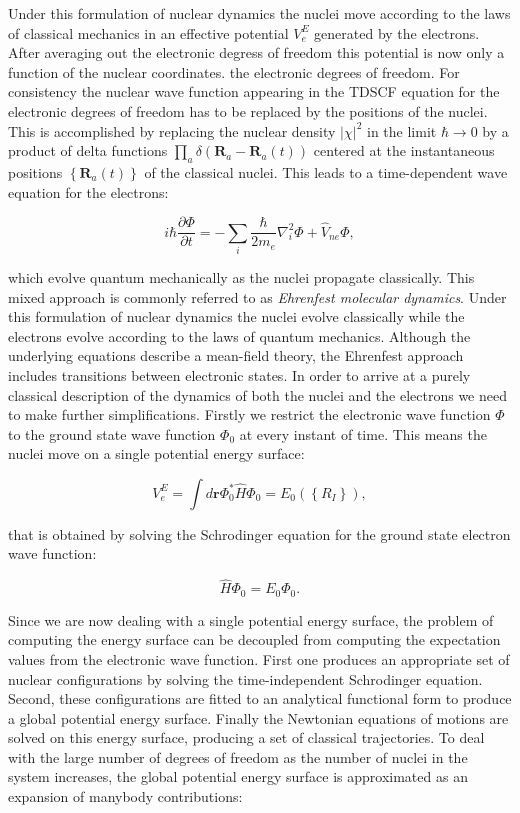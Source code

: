 Under this formulation of nuclear dynamics
the nuclei move according to the laws of classical
mechanics in an effective potential $V_e^E$ generated
by the electrons.
After averaging out the electronic degress of freedom
this potential is now only a function of the nuclear coordinates.
the electronic degrees of freedom.
For consistency the nuclear wave function appearing
in the TDSCF equation for the electronic
degrees of freedom has to be replaced by the positions
of the nuclei.
This is accomplished by replacing the nuclear density 
$\left| \chi \right|^2$ in the limit $\hbar \rightarrow 0$
by a product of delta functions
$ \prod_a \delta (\bm{R}_a - \bm{R}_a(t)) $ centered
at the instantaneous positions $\left\{ \bm{R}_a(t) \right\}$
of the classical nuclei.
This leads to a time-dependent wave equation
for the electrons:

\begin{equation}
 i\hbar\frac{\partial \Phi}{\partial t} =
    -\sum_i \frac{\hbar}{2m_e} \nabla_i^2 \Phi
    + \hat{V}_{ne} \Phi , 
\end{equation}

which evolve quantum mechanically as the nuclei propagate
classically. This mixed approach is commonly referred to as
\textit{Ehrenfest molecular dynamics}.
Under this formulation of nuclear dynamics the
nuclei evolve classically while the electrons
evolve according to the laws of quantum mechanics.
Although the underlying equations describe a mean-field
theory, the Ehrenfest approach includes transitions
between electronic states.
In order to arrive at a purely classical description of the
dynamics of both the nuclei and the electrons
we need to make further simplifications.
Firstly we restrict the electronic wave function $\Phi$
to the ground state wave function $\Phi_0$
at every instant of time. 
This means the nuclei move on a single potential energy surface:

\begin{equation}
 V_e^E = \int d\bm{r} \Phi_0^* \hat{H} \Phi_0 
    = E_0 \left(\left\{ R_I \right\}\right) , 
\end{equation}

that is obtained by solving the Schrodinger equation
for the ground state electron wave function:

\begin{equation}
 \hat{H} \Phi_0 = E_0 \Phi_0 . 
\end{equation}

Since we are now dealing with a single potential
energy surface, the problem of computing the energy surface
can be decoupled from computing the
expectation values from the electronic wave function.
First one produces an appropriate set of nuclear configurations
by solving the time-independent Schrodinger equation.
Second, these configurations are fitted to an analytical
functional form to produce a global potential energy surface.
Finally the Newtonian equations of motions are solved
on this energy surface, producing a set of classical trajectories.
To deal with the large number of degrees of freedom
as the number of nuclei in the system increases,
the global potential energy surface
is approximated as an expansion of manybody contributions:


